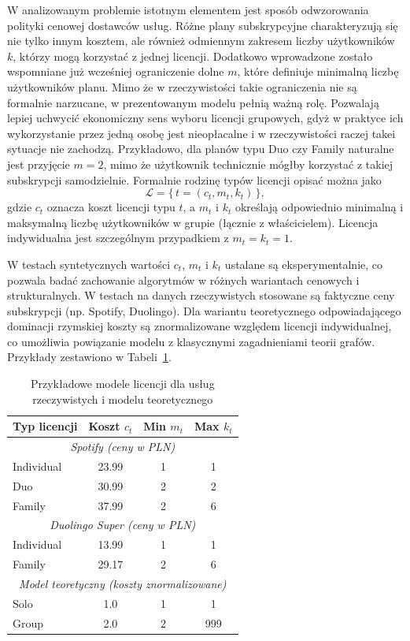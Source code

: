 W analizowanym problemie istotnym elementem jest sposób odwzorowania polityki cenowej dostawców usług. Różne plany subskrypcyjne charakteryzują się nie tylko innym kosztem, ale również odmiennym zakresem liczby użytkowników $k$, którzy mogą korzystać z jednej licencji. Dodatkowo wprowadzone zostało wspomniane już wcześniej ograniczenie dolne $m$, które definiuje minimalną liczbę użytkowników planu. Mimo że w rzeczywistości takie ograniczenia nie są formalnie narzucane, w prezentowanym modelu pełnią ważną rolę. Pozwalają lepiej uchwycić ekonomiczny sens wyboru licencji grupowych, gdyż w praktyce ich wykorzystanie przez jedną osobę jest nieopłacalne i w rzeczywistości raczej takei sytuacje nie zachodzą. Przykładowo, dla planów typu Duo czy Family naturalne jest przyjęcie $m=2$, mimo że użytkownik technicznie mógłby korzystać z takiej subskrypcji samodzielnie. Formalnie rodzinę typów licencji opisać można jako
\[
\mathcal{L} = \{\, t = (c_t, m_t, k_t) \,\},
\]
gdzie $c_t$ oznacza koszt licencji typu $t$, a $m_t$ i $k_t$ określają odpowiednio minimalną i maksymalną liczbę użytkowników w grupie (łącznie z właścicielem). Licencja indywidualna jest szczególnym przypadkiem z $m_t = k_t = 1$.

W testach syntetycznych wartości $c_t$, $m_t$ i $k_t$ ustalane są eksperymentalnie, co pozwala badać zachowanie algorytmów w różnych wariantach cenowych i strukturalnych. W testach na danych rzeczywistych stosowane są faktyczne ceny subskrypcji (np. Spotify, Duolingo). Dla wariantu teoretycznego odpowiadającego dominacji rzymskiej koszty są znormalizowane względem licencji indywidualnej, co umożliwia powiązanie modelu z klasycznymi zagadnieniami teorii grafów. Przykłady zestawiono w Tabeli~\ref{tab:license_models}.

\begin{table}[h!]
\centering
\caption{Przykładowe modele licencji dla usług rzeczywistych i modelu teoretycznego}
\label{tab:license_models}
\begin{tabular}{lccc}
\hline
\textbf{Typ licencji} & \textbf{Koszt $c_t$} & \textbf{Min $m_t$} & \textbf{Max $k_t$} \\
\hline
\multicolumn{4}{c}{\textit{Spotify (ceny w PLN)}} \\
Individual & 23.99 & 1 & 1 \\
Duo        & 30.99 & 2 & 2 \\
Family     & 37.99 & 2 & 6 \\
\hline
\multicolumn{4}{c}{\textit{Duolingo Super (ceny w PLN)}} \\
Individual & 13.99 & 1 & 1 \\
Family     & 29.17 & 2 & 6 \\
\hline
\multicolumn{4}{c}{\textit{Model teoretyczny (koszty znormalizowane)}} \\
Solo       & 1.0   & 1 & 1 \\
Group      & 2.0   & 2 & 999 \\
\hline
\end{tabular}
\end{table}

